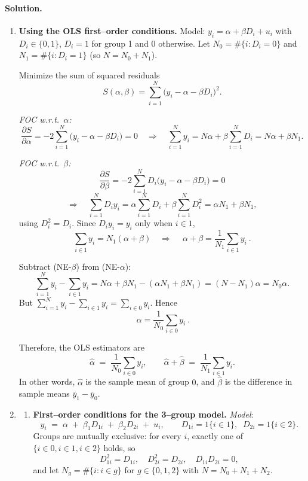 \documentclass[12pt]{article}
\numberwithin{equation}{section}
\newcommand{\solution}{\paragraph{Solution.}}
\begin{document}
\solution
\begin{enumerate}[label=(\alph*),leftmargin=1.3em]
  \item[(a)] \textbf{Using the OLS first–order conditions.}
        Model: \(y_i=\alpha+\beta D_i+u_i\) with \(D_i\in\{0,1\}\), \(D_i=1\) for group 1 and \(0\) otherwise.
        Let \(N_0=\#\{i:D_i=0\}\) and \(N_1=\#\{i:D_i=1\}\) (so \(N=N_0+N_1\)).
        
        Minimize the sum of squared residuals
        \[
        S(\alpha,\beta)=\sum_{i=1}^N\big(y_i-\alpha-\beta D_i\big)^2 .
        \]
        
        \emph{FOC w.r.t.\ \(\alpha\):}
        \[
        \frac{\partial S}{\partial \alpha}
        = -2\sum_{i=1}^N\big(y_i-\alpha-\beta D_i\big)=0
        \quad\Longrightarrow\quad
        \sum_{i=1}^N y_i
        = N\alpha+\beta\sum_{i=1}^N D_i
        = N\alpha+\beta N_1. \tag{NE-$\alpha$}
        \]
        
        \emph{FOC w.r.t.\ \(\beta\):}
        \[
        \frac{\partial S}{\partial \beta}
        = -2\sum_{i=1}^N D_i\big(y_i-\alpha-\beta D_i\big)=0
        \]
        \[
        \Longrightarrow\quad
        \sum_{i=1}^N D_i y_i
        = \alpha\sum_{i=1}^N D_i + \beta\sum_{i=1}^N D_i^2
        = \alpha N_1 + \beta N_1, \tag{NE-$\beta$}
        \]
        using \(D_i^2=D_i\). Since \(D_i y_i=y_i\) only when \(i\in1\),
        \[
        \sum_{i\in 1} y_i = N_1(\alpha+\beta)
        \quad\Longrightarrow\quad
        \ \alpha+\beta = \frac{1}{N_1}\sum_{i\in 1} y_i\ . \tag{A}
        \]
        
        Subtract (NE-\(\beta\)) from (NE-\(\alpha\)):
        \[
        \sum_{i=1}^N y_i - \sum_{i\in 1} y_i
        = N\alpha+\beta N_1 - (\alpha N_1+\beta N_1)
        = (N-N_1)\alpha
        = N_0 \alpha .
        \]
        But \(\sum_{i=1}^N y_i - \sum_{i\in 1} y_i = \sum_{i\in 0} y_i\). Hence
        \[
        \ \alpha = \frac{1}{N_0}\sum_{i\in 0} y_i\ . \tag{B}
        \]
        
        Therefore, the OLS estimators are
        \[
        \hat\alpha \;=\; \frac{1}{N_0}\sum_{i\in 0} y_i,
        \qquad
        \hat\alpha+\hat\beta \;=\; \frac{1}{N_1}\sum_{i\in 1} y_i.
        \]
        In other words, $\hat\alpha$ is the sample mean of group $0$, and 
        $\hat\beta$ is the difference in sample means $\bar y_1 - \bar y_0$.

  \item[(b)]
    \begin{enumerate}[label=\roman*.]
      \item 
      \textbf{First–order conditions for the 3–group model.}
        \textit{Model}:
        \[
        y_i \;=\; \alpha \;+\; \beta_1 D_{1i} \;+\; \beta_2 D_{2i} \;+\; u_i,
        \qquad D_{1i}=1\{i\in 1\},\;\; D_{2i}=1\{i\in 2\}.
        \]
        Groups are mutually exclusive: for every $i$, exactly one of $\{i\in0, i\in1, i\in2\}$ holds, so
        \[
        D_{1i}^2=D_{1i},\quad D_{2i}^2=D_{2i},\quad D_{1i}D_{2i}=0,
        \]
        and let $N_g=\#\{i:i\in g\}$ for $g\in\{0,1,2\}$ with $N=N_0+N_1+N_2$.
        

\end{enumerate}
\end{enumerate}
\end{document}
